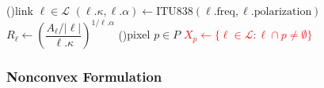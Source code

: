 \documentclass[a4paper,fleqn]{cas-sc}
\begin{document}
\begin{algorithm}[H]
  \caption{Discretized ILDW. Rainfall is averaged by inverse squared distance to a link. Lines that are different from their corresponding lines in IDW are colored red. }
  \label{alg:ildw}
  \DontPrintSemicolon
  \ForEach(){link $\ell \in \mathcal{L}$}{%
    $(\ell.\kappa,\ell.\alpha) \gets \mathrm{ITU838}(\ell.\mathrm{freq},\ell.\mathrm{polarization})$\;
    $R_\ell\gets \left(\dfrac{A_\ell/|\ell|}{\ell.\kappa}\right)^{1/\ell.\alpha}$\;
  }
  \ForEach(){pixel $p \in {P}$}{
    \textcolor{red}{$X_p \gets \{\ell \in \mathcal{L} : \ell\cap p \neq \emptyset\}$}\;
  }
\end{algorithm}

\newpage
\subsubsection{Nonconvex Formulation}
\end{document}
